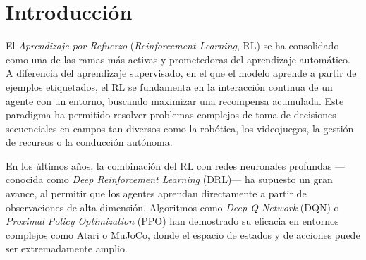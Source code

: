 \documentclass[12pt,a4paper,twoside,openany]{book}
\let\cleardoublepage\clearpage
\begin{document}
\setcounter{section}{0} %
\renewcommand{\thesection}{\arabic{section}} %


\hypersetup{pageanchor=true}


\newpage

\newpage

\pagestyle{fancy}
\renewcommand{\chaptermark}[1]{ \markboth{#1}{}}
\renewcommand{\sectionmark}[1]{\markright{ \thesection.\ #1}}
\lhead[\fancyplain{}{\bfseries\thepage}]{\fancyplain{}{\bfseries\rightmark}}
\rhead[\fancyplain{}{\bfseries\leftmark}]{\fancyplain{}{\bfseries\thepage}}
\cfoot{}

\cleardoublepage
{}
{}
\tableofcontents
\cleardoublepage
{}
{}
\listoffigures
\cleardoublepage
{}
{}
\listoftables

\thispagestyle{empty}


\pagestyle{fancy}
\renewcommand{\chaptermark}[1]{ \markboth{#1}{}}
\renewcommand{\sectionmark}[1]{\markright{ \thesection.\ #1}}
\lhead[\fancyplain{}{\bfseries\thepage}]{\fancyplain{}{\bfseries\rightmark}}
\rhead[\fancyplain{}{\bfseries\leftmark}]{\fancyplain{}{\bfseries\thepage}}
\cfoot{}

\onehalfspacing

\section{Introducción}

El \textit{Aprendizaje por Refuerzo} (\textit{Reinforcement Learning}, RL) se ha consolidado como una de las ramas más activas y prometedoras del aprendizaje automático. A diferencia del aprendizaje supervisado, en el que el modelo aprende a partir de ejemplos etiquetados, el RL se fundamenta en la interacción continua de un agente con un entorno, buscando maximizar una recompensa acumulada. Este paradigma ha permitido resolver problemas complejos de toma de decisiones secuenciales en campos tan diversos como la robótica, los videojuegos, la gestión de recursos o la conducción autónoma.

En los últimos años, la combinación del RL con redes neuronales profundas —conocida como \textit{Deep Reinforcement Learning} (DRL)— ha supuesto un gran avance, al permitir que los agentes aprendan directamente a partir de observaciones de alta dimensión. Algoritmos como \textit{Deep Q-Network} (DQN) o \textit{Proximal Policy Optimization} (PPO) han demostrado su eficacia en entornos complejos como Atari o MuJoCo, donde el espacio de estados y de acciones puede ser extremadamente amplio.
\end{document}
